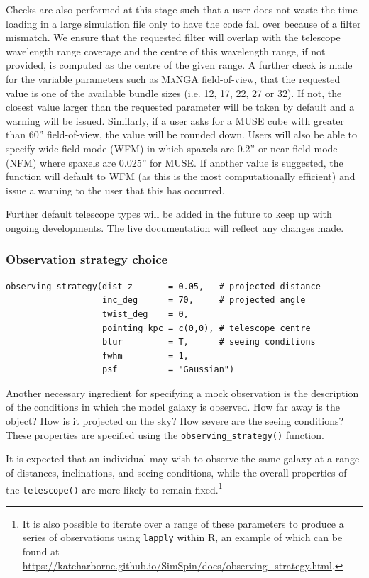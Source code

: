\documentclass[
  journal=pasa,
  manuscript=research-paper, %
  year=2020,
  volume=37,
]{cup-journal}
\newcommand{\telescope}[1]{\texttt{telescope()}#1}
\newcommand{\observingstrategy}[1]{\texttt{observing\_strategy()}#1}
\begin{document}
Checks are also performed at this stage such that a user does not waste the time loading in a large simulation file only to have the code fall over because of a filter mismatch. 
We ensure that the requested filter will overlap with the telescope wavelength range coverage and the centre of this wavelength range, if not provided, is computed as the centre of the given range. 
A further check is made for the variable parameters such as \textsc{MaNGA} field-of-view, that the requested value is one of the available bundle sizes (i.e. 12, 17, 22, 27 or 32). 
If not, the closest value larger than the requested parameter will be taken by default and a warning will be issued.
Similarly, if a user asks for a MUSE cube with greater than 60'' field-of-view, the value will be rounded down. 
Users will also be able to specify wide-field mode (WFM) in which spaxels are 0.2'' or near-field mode (NFM) where spaxels are 0.025'' for MUSE. 
If another value is suggested, the function will default to WFM (as this is the most computationally efficient) and issue a warning to the user that this has occurred. 

Further default telescope types will be added in the future to keep up with ongoing developments.
The live documentation will reflect any changes made.

\subsubsection{Observation strategy choice} \label{sec:observation}
\begin{lstlisting}[basicstyle=\fontsize{6}{8}\selectfont\ttfamily]
observing_strategy(dist_z       = 0.05,   # projected distance
                   inc_deg      = 70,     # projected angle
                   twist_deg    = 0,      
                   pointing_kpc = c(0,0), # telescope centre 
                   blur         = T,      # seeing conditions
                   fwhm         = 1,
                   psf          = "Gaussian")      
\end{lstlisting}

Another necessary ingredient for specifying a mock observation is the description of the conditions in which the model galaxy is observed.
How far away is the object? 
How is it projected on the sky? 
How severe are the seeing conditions?
These properties are specified using the \observingstrategy{} function. 

It is expected that an individual may wish to observe the same galaxy at a range of distances, inclinations, and seeing conditions, while the overall properties of the \telescope{} are more likely to remain fixed.\footnote{It is also possible to iterate over a range of these parameters to produce a series of observations using \texttt{lapply} within R, an example of which can be found at \url{https://kateharborne.github.io/SimSpin/docs/observing_strategy.html}.}
\end{document}
